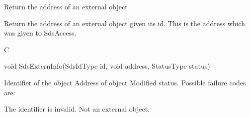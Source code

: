 \begin{manroutinedescription}
      Return the address of an external object

      Return the address of an external {} object given its id.
      This is the address which was given to SdsAccess.

      C

      void SdsExternInfo(SdsIdType id, void {\mantt{**}} address, StatusType {%
\mantt{*}} {} status)

\begin{manparametertable}
 Identifier of the object
 Address of object
 Modified status. Possible %
failure codes are:
\end{manparametertable}
\begin{mantwocolumntable}
The identifier is invalid.
Not an external object.
\end{mantwocolumntable}
\end{manroutinedescription}
